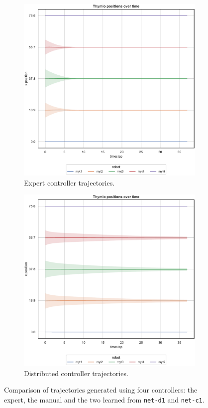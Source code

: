 \begin{figure}[H]
	\begin{center}
		\begin{subfigure}[h]{0.49\textwidth}
			\centering
			\includegraphics[width=.9\textwidth]{contents/images/net-d1/position-overtime-omniscient}%
			\caption{Expert controller trajectories.}
		\end{subfigure}
		\hfill
		\begin{subfigure}[h]{0.49\textwidth}
			\centering
			\includegraphics[width=.9\textwidth]{contents/images/net-d1/position-overtime-learned_distributed}
			\caption{Distributed controller trajectories.}
		\end{subfigure}
	\end{center}
	\caption[Evaluation of the trajectories learned by \texttt{net-c1}.]{Comparison 
	of trajectories generated using four controllers: the expert, the manual and the 
	two learned from \texttt{net-d1} and \texttt{net-c1}.}
\end{figure}

